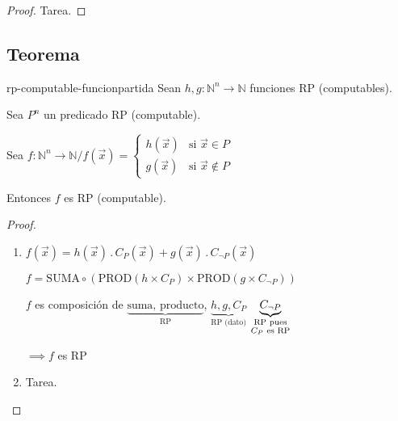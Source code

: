 \begin{proof}
    Tarea.
\end{proof}

\subsection{Teorema}
%
\begin{teorema}{}{rp-computable-funcionpartida}
    Sean $h,g: \mathbb{N}^n \to \mathbb{N}$ funciones RP (computables).

    Sea ${P}^n$ un predicado RP (computable).

    Sea $f: \mathbb{N}^n \to \mathbb{N} / f(\overrightarrow{x}) = \begin{cases}
        h(\overrightarrow{x}) & \text{si } \overrightarrow{x} \in {P}\\
        g(\overrightarrow{x}) & \text{si } \overrightarrow{x}\notin{P}
    \end{cases}$

    \medskip

    Entonces $f$ es RP (computable).
\end{teorema}

\begin{proof} \phantom{.}

    \begin{enumerate}
        \item $f(\overrightarrow{x}) = 
            h(\overrightarrow{x}) \, . \, C_{{P}}(\overrightarrow{x}) 
            + g(\overrightarrow{x}) \, . \, C_{\neg P} (\overrightarrow{x})$

            $f = \mathrm{SUMA} \circ (\mathrm{PROD}( h \times C_{{P}} ) \times  \mathrm{PROD} (g \times C_{\neg P}))$

            $f$ es composición de 
            $\underbrace{\text{suma, producto}}_{\text{RP}}$,
            $\underbrace{h, g, C_{{P}}}_{\text{RP (dato)}}$
            $\underbrace{C_{\neg {P}}}_{%
                \substack{\text{RP pues}\\ C_{{P}} \text{ es RP}}}$
            \begin{center}
                $\implies f$ es RP
            \end{center}

        \item Tarea.
    \end{enumerate}
\end{proof}


